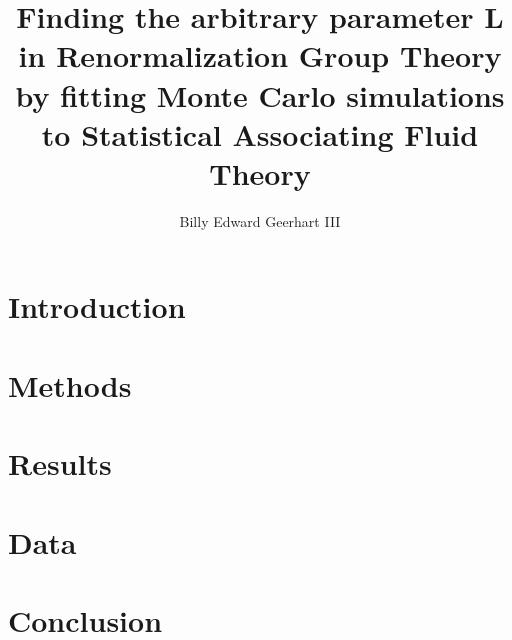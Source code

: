 \documentclass[12pt,twoside]{report}
\title{Finding the arbitrary parameter L in Renormalization Group Theory by fitting Monte Carlo simulations to Statistical Associating Fluid Theory}
\author{Billy Edward Geerhart III}
\begin{document}






\tableofcontents

\listoffigures

\chapter{Introduction}


\chapter{Methods}


\chapter{Results}


\chapter{Data}


\chapter{Conclusion}



\end{document}
